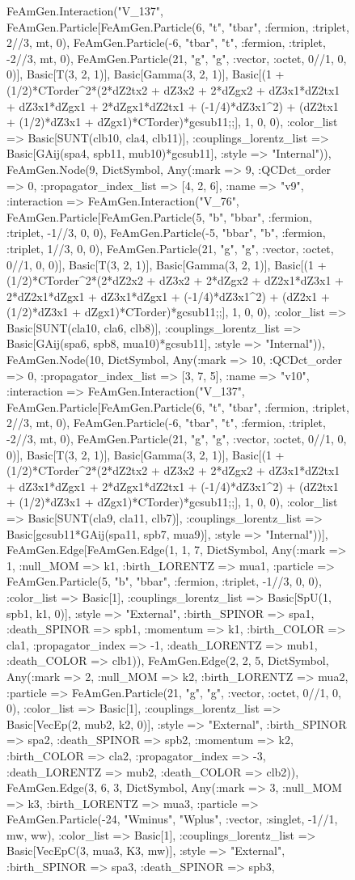 \documentclass{revtex4}
\begin{document}
\begin{figure}[!htb]
\begin{center}
{FeAmGen.Interaction("V_137", FeAmGen.Particle[FeAmGen.Particle(6, "t", "tbar", :fermion, :triplet, 2//3, mt, 0), FeAmGen.Particle(-6, "tbar", "t", :fermion, :triplet, -2//3, mt, 0), FeAmGen.Particle(21, "g", "g", :vector, :octet, 0//1, 0, 0)], Basic[T(3, 2, 1)], Basic[Gamma(3, 2, 1)], Basic[(1 + (1/2)*CTorder^2*(2*dZ2tx2 + dZ3x2 + 2*dZgx2 + dZ3x1*dZ2tx1 + dZ3x1*dZgx1 + 2*dZgx1*dZ2tx1 + (-1/4)*dZ3x1^2) + (dZ2tx1 + (1/2)*dZ3x1 + dZgx1)*CTorder)*gcsub11;;], 1, 0, 0), :color_list => Basic[SUNT(clb10, cla4, clb11)], :couplings_lorentz_list => Basic[GAij(spa4, spb11, mub10)*gcsub11], :style => "Internal")), FeAmGen.Node(9, Dict{Symbol, Any}(:mark => 9, :QCDct_order => 0, :propagator_index_list => [4, 2, 6], :name => "v9", :interaction => FeAmGen.Interaction("V_76", FeAmGen.Particle[FeAmGen.Particle(5, "b", "bbar", :fermion, :triplet, -1//3, 0, 0), FeAmGen.Particle(-5, "bbar", "b", :fermion, :triplet, 1//3, 0, 0), FeAmGen.Particle(21, "g", "g", :vector, :octet, 0//1, 0, 0)], Basic[T(3, 2, 1)], Basic[Gamma(3, 2, 1)], Basic[(1 + (1/2)*CTorder^2*(2*dZ2x2 + dZ3x2 + 2*dZgx2 + dZ2x1*dZ3x1 + 2*dZ2x1*dZgx1 + dZ3x1*dZgx1 + (-1/4)*dZ3x1^2) + (dZ2x1 + (1/2)*dZ3x1 + dZgx1)*CTorder)*gcsub11;;], 1, 0, 0), :color_list => Basic[SUNT(cla10, cla6, clb8)], :couplings_lorentz_list => Basic[GAij(spa6, spb8, mua10)*gcsub11], :style => "Internal")), FeAmGen.Node(10, Dict{Symbol, Any}(:mark => 10, :QCDct_order => 0, :propagator_index_list => [3, 7, 5], :name => "v10", :interaction => FeAmGen.Interaction("V_137", FeAmGen.Particle[FeAmGen.Particle(6, "t", "tbar", :fermion, :triplet, 2//3, mt, 0), FeAmGen.Particle(-6, "tbar", "t", :fermion, :triplet, -2//3, mt, 0), FeAmGen.Particle(21, "g", "g", :vector, :octet, 0//1, 0, 0)], Basic[T(3, 2, 1)], Basic[Gamma(3, 2, 1)], Basic[(1 + (1/2)*CTorder^2*(2*dZ2tx2 + dZ3x2 + 2*dZgx2 + dZ3x1*dZ2tx1 + dZ3x1*dZgx1 + 2*dZgx1*dZ2tx1 + (-1/4)*dZ3x1^2) + (dZ2tx1 + (1/2)*dZ3x1 + dZgx1)*CTorder)*gcsub11;;], 1, 0, 0), :color_list => Basic[SUNT(cla9, cla11, clb7)], :couplings_lorentz_list => Basic[gcsub11*GAij(spa11, spb7, mua9)], :style => "Internal"))], FeAmGen.Edge[FeAmGen.Edge(1, 1, 7, Dict{Symbol, Any}(:mark => 1, :null_MOM => k1, :birth_LORENTZ => mua1, :particle => FeAmGen.Particle(5, "b", "bbar", :fermion, :triplet, -1//3, 0, 0), :color_list => Basic[1], :couplings_lorentz_list => Basic[SpU(1, spb1, k1, 0)], :style => "External", :birth_SPINOR => spa1, :death_SPINOR => spb1, :momentum => k1, :birth_COLOR => cla1, :propagator_index => -1, :death_LORENTZ => mub1, :death_COLOR => clb1)), FeAmGen.Edge(2, 2, 5, Dict{Symbol, Any}(:mark => 2, :null_MOM => k2, :birth_LORENTZ => mua2, :particle => FeAmGen.Particle(21, "g", "g", :vector, :octet, 0//1, 0, 0), :color_list => Basic[1], :couplings_lorentz_list => Basic[VecEp(2, mub2, k2, 0)], :style => "External", :birth_SPINOR => spa2, :death_SPINOR => spb2, :momentum => k2, :birth_COLOR => cla2, :propagator_index => -3, :death_LORENTZ => mub2, :death_COLOR => clb2)), FeAmGen.Edge(3, 6, 3, Dict{Symbol, Any}(:mark => 3, :null_MOM => k3, :birth_LORENTZ => mua3, :particle => FeAmGen.Particle(-24, "Wminus", "Wplus", :vector, :singlet, -1//1, mw, ww), :color_list => Basic[1], :couplings_lorentz_list => Basic[VecEpC(3, mua3, K3, mw)], :style => "External", :birth_SPINOR => spa3, :death_SPINOR => spb3, }
\end{center}
\end{figure}
\end{document}

